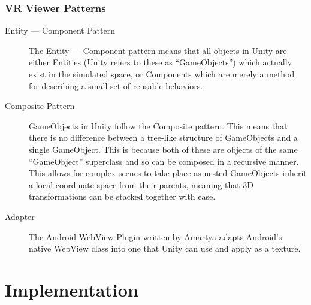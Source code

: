 \documentclass[12pt]{report}
\begin{document}
\subsubsection{VR Viewer Patterns}
\begin{description}
    \item [Entity --- Component Pattern] The Entity --- Component pattern means
        that all objects in Unity are either Entities (Unity refers to these as
        ``GameObjects'') which actually exist in the simulated space, or
        Components which are merely a method for describing a small set of
        reusable behaviors.

    \item [Composite Pattern] GameObjects in Unity follow the Composite
        pattern. This means that there is no difference between a tree-like
        structure of GameObjects and a single GameObject. This is because both
        of these are objects of the same ``GameObject'' superclass and so can
        be composed in a recursive manner. This allows for complex scenes to
        take place as nested GameObjects inherit a local coordinate space from
        their parents, meaning that 3D transformations can be stacked together
        with ease.

    \item [Adapter] The Android WebView Plugin written by Amartya adapts
        Android's native WebView class into one that Unity can use and apply as
        a texture.

\end{description}

\section{Implementation}
\end{document}
